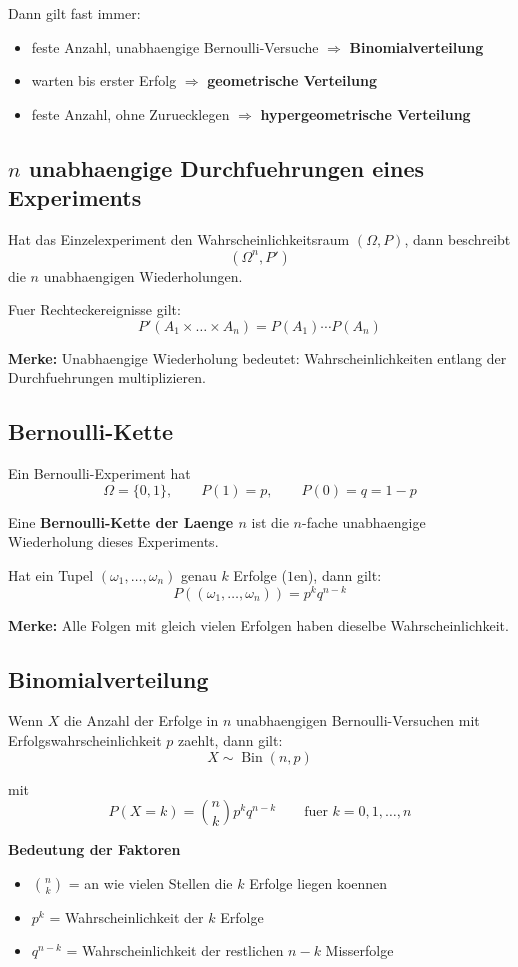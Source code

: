 \documentclass[a4paper,11pt]{article}
\begin{document}
Dann gilt fast immer:
\begin{itemize}
  \item feste Anzahl, unabhaengige Bernoulli-Versuche $\Rightarrow$ \textbf{Binomialverteilung}
  \item warten bis erster Erfolg $\Rightarrow$ \textbf{geometrische Verteilung}
  \item feste Anzahl, ohne Zuruecklegen $\Rightarrow$ \textbf{hypergeometrische Verteilung}
\end{itemize}

\subsection{$n$ unabhaengige Durchfuehrungen eines Experiments}
Hat das Einzelexperiment den Wahrscheinlichkeitsraum $(\Omega,P)$, dann beschreibt
\[
(\Omega^n,P')
\]
die $n$ unabhaengigen Wiederholungen.

Fuer Rechteckereignisse gilt:
\[
P'(A_1 \times \dots \times A_n)=P(A_1)\cdots P(A_n)
\]

\textbf{Merke:}
Unabhaengige Wiederholung bedeutet: Wahrscheinlichkeiten entlang der Durchfuehrungen multiplizieren.

\subsection{Bernoulli-Kette}
Ein Bernoulli-Experiment hat
\[
\Omega=\{0,1\}, \qquad P(1)=p,\qquad P(0)=q=1-p
\]

Eine \textbf{Bernoulli-Kette der Laenge $n$} ist die $n$-fache unabhaengige Wiederholung dieses Experiments.

Hat ein Tupel $(\omega_1,\dots,\omega_n)$ genau $k$ Erfolge ($1$en), dann gilt:
\[
P((\omega_1,\dots,\omega_n))=p^k q^{n-k}
\]

\textbf{Merke:}
Alle Folgen mit gleich vielen Erfolgen haben dieselbe Wahrscheinlichkeit.

\subsection{Binomialverteilung}
Wenn $X$ die Anzahl der Erfolge in $n$ unabhaengigen Bernoulli-Versuchen mit Erfolgswahrscheinlichkeit $p$ zaehlt, dann gilt:
\[
X \sim \operatorname{Bin}(n,p)
\]

mit
\[
P(X=k)=\binom{n}{k}p^k q^{n-k}
\qquad \text{fuer } k=0,1,\dots,n
\]

\textbf{Bedeutung der Faktoren}
\begin{itemize}
  \item $\binom{n}{k}$ = an wie vielen Stellen die $k$ Erfolge liegen koennen
  \item $p^k$ = Wahrscheinlichkeit der $k$ Erfolge
  \item $q^{n-k}$ = Wahrscheinlichkeit der restlichen $n-k$ Misserfolge
\end{itemize}
\end{document}
